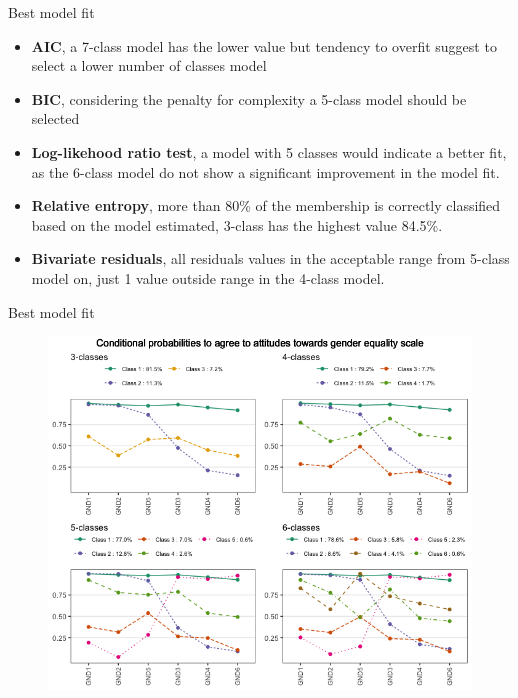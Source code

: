 \documentclass[11pt,t]{beamer}
\begin{document}
\begin{frame}{Best model fit}
	\vspace{-2mm} 
\begin{itemize}
	\item \textbf{AIC}, a 7-class model has the lower value but tendency to overfit suggest to select a lower number of classes model
		\vspace{2mm} 
	\item \textbf{BIC}, considering the penalty for complexity a 5-class model should be selected 
		\vspace{2mm} 
	\item \textbf{Log-likehood ratio test}, a model with 5 classes would indicate a better fit, as the 6-class model do not show a significant improvement in the model fit.
		\vspace{2mm} 
	\item \textbf{Relative entropy}, more than 80\% of the membership is correctly classified based on the model estimated, 3-class has the highest value 84.5\%.
		\vspace{2mm} 
	\item \textbf{Bivariate residuals}, all residuals values in the acceptable range from 5-class model on, just 1 value outside range in the 4-class model. 
\end{itemize}
\end{frame} 



\begin{frame}[c,plain]{Best model fit}
\vspace{-5pt} 
\begin{figure}
	\centering
	\includegraphics[height=0.7\textwidth]{graphics/genderclasses.png}
\end{figure}

\end{frame} 
\end{document}
